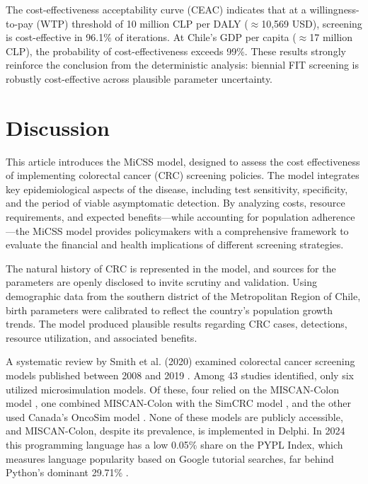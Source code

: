 \documentclass[sn-mathphys-num]{sn-jnl}%
\theoremstyle{thmstyleone}%
\theoremstyle{thmstyletwo}%
\theoremstyle{thmstylethree}%
\begin{document}
The cost-effectiveness acceptability curve (CEAC) indicates that at a willingness-to-pay (WTP) threshold of 10 million CLP per DALY ($\approx$10,569 USD), screening is cost-effective in 96.1\% of iterations. At Chile's GDP per capita ($\approx$17 million CLP), the probability of cost-effectiveness exceeds 99\%. These results strongly reinforce the conclusion from the deterministic analysis: biennial FIT screening is robustly cost-effective across plausible parameter uncertainty.

\newpage
\section{Discussion}

This article introduces the MiCSS model, designed to assess the cost effectiveness of implementing colorectal cancer (CRC) screening policies. The model integrates key epidemiological aspects of the disease, including test sensitivity, specificity, and the period of viable asymptomatic detection. By analyzing costs, resource requirements, and expected benefits—while accounting for population adherence—the MiCSS model provides policymakers with a comprehensive framework to evaluate the financial and health implications of different screening strategies.

The natural history of CRC is represented in the model, and sources for the parameters are openly disclosed to invite scrutiny and validation. Using demographic data from the southern district of the Metropolitan Region of Chile, birth parameters were calibrated to reflect the country’s population growth trends. The model produced plausible results regarding CRC cases, detections, resource utilization, and associated benefits.

A systematic review by Smith et al. (2020) examined colorectal cancer screening models published between 2008 and 2019 \cite{smith_simulation_2020}. Among 43 studies identified, only six utilized microsimulation models. Of these, four relied on the MISCAN-Colon model \cite{loeve_miscan-colon_1999}, one combined MISCAN-Colon with the SimCRC model \cite{noauthor_simcrc_nodate}, and the other used Canada’s OncoSim model \cite{gauvreau_oncosim_2017}. None of these models are publicly accessible, and MISCAN-Colon, despite its prevalence, is implemented in Delphi. In 2024 this programming language has a low 0.05\% share on the PYPL Index, which measures language popularity based on Google tutorial searches, far behind Python's dominant 29.71\% \cite{noauthor_pypl_nodate}.
\end{document}
